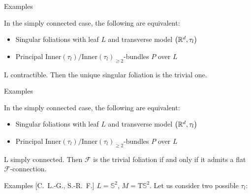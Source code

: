 \documentclass[
aspectratio=3218, 
10pt
]{beamer}
\theoremstyle{plain}
\theoremstyle{remark}
\begin{document}
{

\begin{frame}{Examples}
\begin{theorem}[{[C.\ L.-G., S.-R.\ F.]}]\vspace{.5pt}
In the simply connected case, the following are equivalent:
\begin{itemize}
	\item Singular foliations with leaf $L$ and transverse model $\mleft(\mathbb{R}^d, \tau_l\mright)$
	\item Principal $\mathrm{Inner}(\tau_l)/\mathrm{Inner}(\tau_l)_{\geq 2}$-bundles $P$ over $L$
\end{itemize}
\end{theorem}

\begin{corollary}[{[C.\ L.-G., S.-R.\ F.]}]\vspace{.5pt}
L contractible. Then the unique singular foliation is the trivial one.
\end{corollary}
\end{frame}

\begin{frame}{Examples}
\begin{theorem}[{[C.\ L.-G., S.-R.\ F.]}]\vspace{.5pt}
In the simply connected case, the following are equivalent:
\begin{itemize}
	\item Singular foliations with leaf $L$ and transverse model $\mleft(\mathbb{R}^d, \tau_l\mright)$
	\item Principal $\mathrm{Inner}(\tau_l)/\mathrm{Inner}(\tau_l)_{\geq 2}$-bundles $P$ over $L$
\end{itemize}
\end{theorem}

\begin{corollary}[{[C.\ L.-G., S.-R.\ F.]}]\vspace{.5pt}
L simply connected. Then $\mathcal{F}$ is the trivial foliation if and only if it admits a flat $\mathcal{F}$-connection.
\end{corollary}
\end{frame}


\begin{frame}{Examples {[C.\ L.-G., S.-R.\ F.]}}
$L = \mathbb{S}^2$, $M = \mathrm{T}\mathbb{S}^2$. Let us consider two possible $\tau_l$:


\end{frame}}
\end{document}
